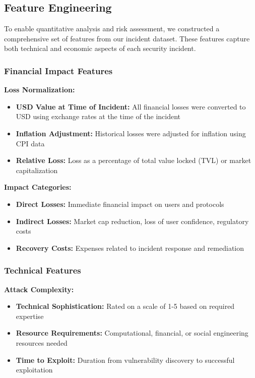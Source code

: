 \subsection{Feature Engineering}
\label{sec:feature_engineering}

To enable quantitative analysis and risk assessment, we constructed a comprehensive set of features from our incident dataset. These features capture both technical and economic aspects of each security incident.

\subsubsection{Financial Impact Features}
\textbf{Loss Normalization:}
\begin{itemize}
    \item \textbf{USD Value at Time of Incident:} All financial losses were converted to USD using exchange rates at the time of the incident
    \item \textbf{Inflation Adjustment:} Historical losses were adjusted for inflation using CPI data
    \item \textbf{Relative Loss:} Loss as a percentage of total value locked (TVL) or market capitalization
\end{itemize}

\textbf{Impact Categories:}
\begin{itemize}
    \item \textbf{Direct Losses:} Immediate financial impact on users and protocols
    \item \textbf{Indirect Losses:} Market cap reduction, loss of user confidence, regulatory costs
    \item \textbf{Recovery Costs:} Expenses related to incident response and remediation
\end{itemize}

\subsubsection{Technical Features}
\textbf{Attack Complexity:}
\begin{itemize}
    \item \textbf{Technical Sophistication:} Rated on a scale of 1-5 based on required expertise
    \item \textbf{Resource Requirements:} Computational, financial, or social engineering resources needed
    \item \textbf{Time to Exploit:} Duration from vulnerability discovery to successful exploitation
\end{itemize}

